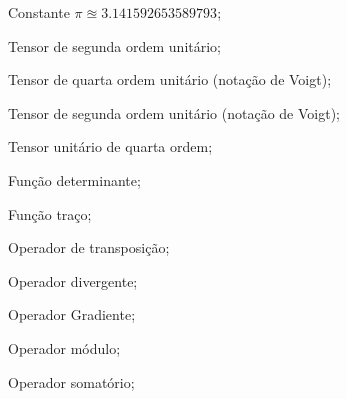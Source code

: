 \item[\textbf{Numéricos, operadores e funções matemáticas:}]
\item[$ \pi $] 		Constante $\pi \approxeq 3.141592653589793$;
\item[$ \Umll $] 	Tensor de segunda ordem unitário;
\item[$ \Umll $] 	Tensor de quarta ordem unitário (notação de Voigt);
\item[$ \Uml $] 	Tensor de segunda ordem unitário (notação de Voigt);
\item[$\Umllll$] Tensor unitário de quarta ordem;
\item[det($*$)] 	Função determinante;
\item[tr($*$)] 	Função traço;
\item[$(*)^T$] 	Operador de transposição;
\item[$ \divl $] 	Operador divergente;
\item[$ \nabla $] 	Operador Gradiente;
\item[$||*||$] 	Operador módulo;
\item[$\sum *$] 	Operador somatório;


















